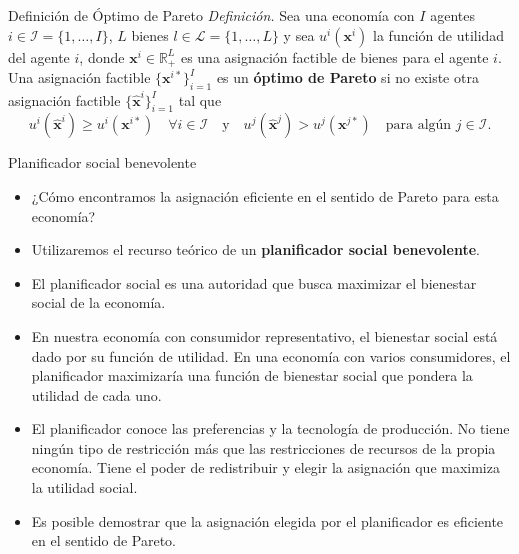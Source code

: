 \documentclass[aspectratio=169,11pt]{beamer}
\newcommand{\cidehighlight}[1]{\textcolor{CIDEBlue}{\bfseries #1}}
\begin{document}
\begin{frame}{Definición de Óptimo de Pareto}
  \textit{Definición.} Sea una economía con \(I\) agentes $i \in \mathcal{I} = \{1, \ldots, I\}$, $L$ bienes $l \in \mathcal{L} = \{1, \ldots, L\}$ y sea \(u^i(\mathbf{x}^i)\) la función de utilidad del agente \(i\), donde \(\mathbf{x}^i \in \mathbb{R}^L_+\) es una asignación factible de bienes para el agente \(i\). Una asignación factible \(\{\mathbf{x}^{i*}\}_{i=1}^I\) es un \cidehighlight{óptimo de Pareto} si no existe otra asignación factible \(\{\mathbf{\hat x}^i\}_{i=1}^I\) tal que
  $$
  u^i(\mathbf{\hat x}^i) \geq u^i(\mathbf{x}^{i*}) \quad \forall i \in \mathcal{I} \quad \text{y} \quad u^j(\mathbf{\hat x}^j) > u^j(\mathbf{x}^{j*}) \quad \text{para algún } j \in \mathcal{I}.
  $$
\end{frame}

\begin{frame}{Planificador social benevolente}
  \begin{itemize}
    \setlength{\itemsep}{0.55em}

    \item ¿Cómo encontramos la asignación eficiente en el sentido
    de Pareto para esta economía?
    \item Utilizaremos el recurso teórico de un \cidehighlight{planificador social benevolente}.
    \item El planificador social es una autoridad que busca maximizar el bienestar social de la economía.
    \item En nuestra economía con consumidor representativo, el bienestar
    social está dado por su función de utilidad. En una economía con varios
    consumidores, el planificador maximizaría una función de bienestar
    social que pondera la utilidad de cada uno.

    \item El planificador conoce las preferencias y la tecnología de producción. No tiene ningún tipo de restricción más que las restricciones de recursos de la propia economía. Tiene el poder de redistribuir y elegir la asignación que maximiza la utilidad social.

    \item Es posible demostrar que la asignación elegida por el planificador es eficiente en el sentido de Pareto.
  \end{itemize}
\end{frame}
\end{document}
